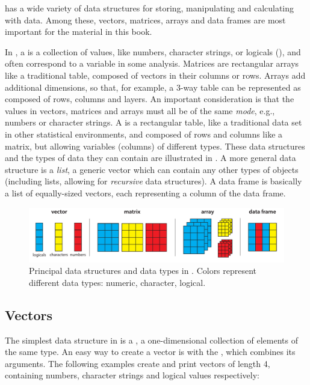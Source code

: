 \documentclass[10pt,krantz2]{krantz}\usepackage[]{graphicx}\usepackage[]{color}
\begin{document}
\R has a wide variety of data structures for storing, manipulating and
calculating with data.  Among these, vectors, matrices, arrays and
data frames are most important for the material in this book.

In \R, a  is a collection of values, like numbers,
character strings, or logicals (), and often correspond to a variable in some analysis.
Matrices are rectangular arrays like a traditional table, composed of vectors in their columns
or rows.
Arrays add additional dimensions, so that, for example, a 3-way table can be represented
as composed of rows, columns and layers.
An important consideration is that the values in vectors,
matrices and arrays must all be of the same \emph{mode}, e.g., numbers or character strings.
A  is a rectangular table, like a traditional data set in other
statistical environments, and composed of rows and columns like a matrix,
but allowing variables (columns) of different types. These data structures and the types of
data they can contain are illustrated in . A more general
data structure is a \emph{list}, a generic vector which can contain
any other types of objects (including lists, allowing for \emph{recursive}
data structures). A data frame is basically a list of equally-sized
vectors, each representing a column of the data frame.

\begin{figure}
\includegraphics[width=\textwidth]{ch02/fig/datatypes2}
\caption[Principal data structures and data types in R]{Principal data structures and data types in \R. Colors
 represent different data types: numeric, character, logical. }
\label{fig:datatypes}
\end{figure}


\subsection{Vectors}
The simplest data structure in \R is a , a one-dimensional
collection of elements of the same type. An easy way to create a vector is with
the , which combines its arguments.  The following examples create
and print vectors of length 4, containing numbers, character strings and
logical values respectively:
\end{document}
